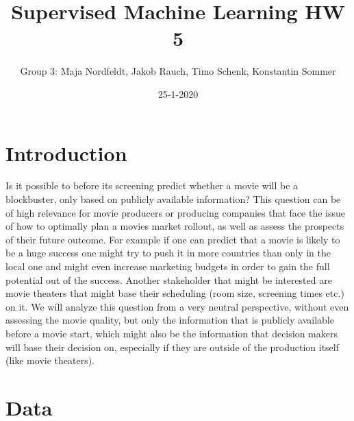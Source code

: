 \documentclass[
]{article}
\title{Supervised Machine Learning HW 5}
\author{Group 3: Maja Nordfeldt, Jakob Rauch, Timo Schenk, Konstantin Sommer}
\date{25-1-2020}
\begin{document}
\maketitle

\hypertarget{introduction}{%
\section{Introduction}\label{introduction}}

Is it possible to before its screening predict whether a movie will be a
blockbuster, only based on publicly available information? This question
can be of high relevance for movie producers or producing companies that
face the issue of how to optimally plan a movies market rollout, as well
as assess the prospects of their future outcome. For example if one can
predict that a movie is likely to be a huge success one might try to
push it in more countries than only in the local one and might even
increase marketing budgets in order to gain the full potential out of
the success. Another stakeholder that might be interested are movie
theaters that might base their scheduling (room size, screening times
etc.) on it. We will analyze this question from a very neutral
perspective, without even assessing the movie quality, but only the
information that is publicly available before a movie start, which might
also be the information that decision makers will base their decision
on, especially if they are outside of the production itself (like movie
theaters).

\hypertarget{data}{%
\section{Data}\label{data}}
\end{document}
